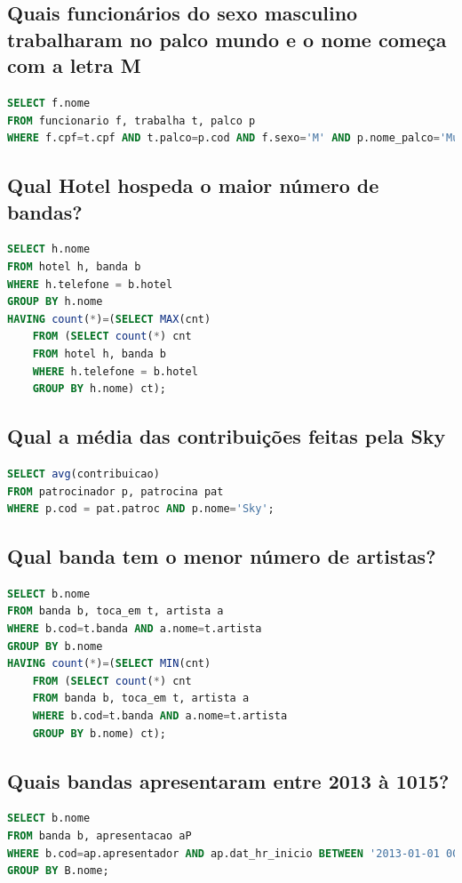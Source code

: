 \documentclass[12pt]{article}
\begin{document}
\subsection{Quais funcionários do sexo masculino trabalharam no palco mundo e o nome começa com a letra M}
\begin{lstlisting}[language=sql]
SELECT f.nome
FROM funcionario f, trabalha t, palco p
WHERE f.cpf=t.cpf AND t.palco=p.cod AND f.sexo='M' AND p.nome_palco='Mundo' AND f.nome LIKE 'M%';
\end{lstlisting}

\subsection{Qual Hotel hospeda o maior número de bandas?}
\begin{lstlisting}[language=sql]
SELECT h.nome
FROM hotel h, banda b
WHERE h.telefone = b.hotel
GROUP BY h.nome
HAVING count(*)=(SELECT MAX(cnt)
	FROM (SELECT count(*) cnt
	FROM hotel h, banda b
	WHERE h.telefone = b.hotel
	GROUP BY h.nome) ct);
\end{lstlisting}

\subsection{Qual a média das contribuições feitas pela Sky}
\begin{lstlisting}[language=sql]
SELECT avg(contribuicao)
FROM patrocinador p, patrocina pat
WHERE p.cod = pat.patroc AND p.nome='Sky';
\end{lstlisting}

\subsection{Qual banda tem o menor número de artistas?}
\begin{lstlisting}[language=sql]
SELECT b.nome
FROM banda b, toca_em t, artista a
WHERE b.cod=t.banda AND a.nome=t.artista
GROUP BY b.nome
HAVING count(*)=(SELECT MIN(cnt)
	FROM (SELECT count(*) cnt
	FROM banda b, toca_em t, artista a
	WHERE b.cod=t.banda AND a.nome=t.artista
	GROUP BY b.nome) ct);
\end{lstlisting}

\subsection{Quais bandas apresentaram entre 2013 à 1015?}
\begin{lstlisting}[language=sql]
SELECT b.nome
FROM banda b, apresentacao aP
WHERE b.cod=ap.apresentador AND ap.dat_hr_inicio BETWEEN '2013-01-01 00:00:00' AND '2015-12-31 23:59:00'
GROUP BY B.nome;
\end{lstlisting}
\end{document}
